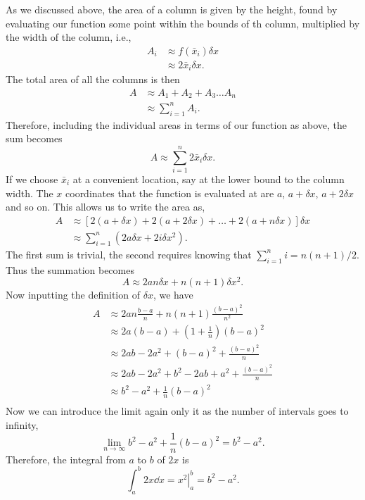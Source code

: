 As we discussed above, the area of a column is given by the height,
found by evaluating our function some point within the bounds of th column,
multiplied by the width of the column, i.e.,
\begin{align*}
    A_i &\approx f(\bar{x}_i) \delta\! x \\
    &\approx 2 \bar{x}_i \delta\! x .
\end{align*}
The total area of all the columns is then
\begin{align*}
    A &\approx A_1 + A_2 + A_3 \ldots A_n \\
    &\approx \sum_{i=1}^n A_i .
\end{align*}
Therefore, including the individual areas in terms of our function as above, the
sum becomes
\begin{equation*}
    A \approx \sum_{i = 1}^{n} 2 \bar{x}_i \delta\! x .
\end{equation*}
If we choose $\bar{x}_i$ at a convenient location, say at the lower bound to the
column width.  The $x$ coordinates that the function is evaluated at are $a$, $a
+ \delta\! x$, $a + 2\delta\! x$ and so on.  This allows us to write the area
as,
\begin{align*}
      A &\approx \left[ 2 (a + \delta\! x) + 2 (a + 2 \delta\! x) 
        + \ldots + 2 (a + n \delta\! x) \right] \delta\! x \\
      &\approx \sum_{i = 1}^{n} (2 a \delta\! x + 2 i \delta\! x^2).
\end{align*}
The first sum is trivial, the second requires knowing that $\sum_{i=1}^{n} i = n
(n + 1)/2$.  Thus the summation becomes
\begin{equation*}
    A \approx 2 a n \delta\! x + n (n + 1) \delta\! x^2.
\end{equation*}
Now inputting the definition of $\delta\! x$, we have
\begin{align*}
    A & \approx 2 a n \frac{b - a}{n} + n (n + 1) \frac{(b - a)^2}{n^2} \\
      & \approx 2 a (b - a) + \left( 1 + \frac{1}{n} \right) (b - a)^2 \\
      & \approx 2 a b - 2 a^2 + (b - a)^2 + \frac{(b - a)^2}{n} \\
      & \approx 2 a b - 2 a^2 + b^2 - 2 a b + a^2 + \frac{(b - a)^2}{n} \\
      & \approx b^2 - a^2 + \frac{1}{n}(b - a)^2 \\
\end{align*}
Now we can introduce the limit again only it as the number of intervals goes to
infinity,
\begin{equation*}
    \lim_{n \to \infty} b^2 - a^2 + \frac{1}{n}(b - a)^2 = b^2 - a^2.
\end{equation*}
Therefore, the integral from $a$ to $b$ of $2 x$ is
\begin{equation*}
    \int_{a}^{b} 2 x \dd{x} = \left. x^2 \right|_{a}^{b} = b^2 - a^2.
\end{equation*}

